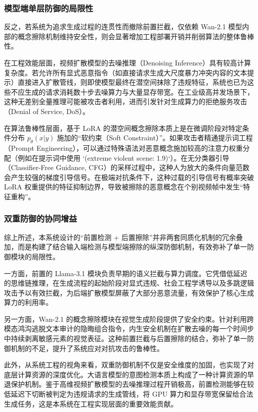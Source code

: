 \subsubsection{模型端单层防御的局限性}

反之，若系统为追求生成过程的连贯性而撤除前置拦截，仅依赖 Wan-2.1 模型内部的概念擦除机制维持安全性，则会显著增加工程部署开销并削弱算法的整体鲁棒性。

在工程效能层面，视频扩散模型的去噪推理（Denoising Inference）具有较高计算复杂度。若允许所有显式恶意指令（如直接请求生成大尺度暴力冲突内容的文本提示）直接进入扩散管线，则即使模型最终在潜空间抹除了违规特征，系统也已为这些不应生成的请求消耗数十步去噪算力与大量显存带宽。在工业级高并发场景下，这种无差别全量推理可能被攻击者利用，进而引发针对生成算力的拒绝服务攻击（Denial of Service, DoS）。

在算法鲁棒性层面，基于 LoRA 的潜空间概念擦除本质上是在微调阶段对特定条件分布 $p_\theta(x|y)$ 施加的“软约束（Soft Constraint）”。如果攻击者精通提示词工程（Prompt Engineering），可以通过特殊语法对恶意概念施加较高的注意力权重分配（例如在提示词中使用 `(extreme violent scene: 1.9)`）。在无分类器引导（Classifier-Free Guidance, CFG）的采样过程中，这种人为放大的条件向量范数会产生较强的梯度引导信号。在极端对抗条件下，这种过载的引导信号有概率突破 LoRA 权重提供的特征抑制边界，导致被擦除的恶意概念在个别视频帧中发生“特征重构”。

\subsubsection{双重防御的协同增益}

综上所述，本系统设计的“前置检测 + 后置擦除”并非两套同质化机制的冗余叠加，而是构建了结合输入端检测与模型端擦除的纵深防御机制，有效弥补了单一防御模块的局限性。

一方面，前置的 Llama-3.1 模块负责早期的语义拦截与算力调度。它凭借低延迟的思维链推理，在生成流程的起始阶段对显式违规、社会工程学诱导以及多跳逻辑攻击予以有效拦截，为后端扩散模型屏蔽了大部分恶意流量，有效保护了核心生成算力的利用率。

另一方面，Wan-2.1 的概念擦除模块在视觉生成阶段提供了安全约束。针对利用跨模态鸿沟逃脱文本审计的隐晦组合指令，内生安全机制在扩散去噪的每一个时间步中持续剥离敏感元素的视觉表征。这种前置拦截与后置擦除的结合，弥补了单一防御机制的不足，提升了系统应对对抗攻击的鲁棒性。

此外，从系统工程的视角来看，双重防御机制不仅是安全维度的加固，也实现了对底层计算资源的深度优化。大语言模型的意图检测本质上构成了一种计算资源的早退保护机制。鉴于高维视频扩散模型的去噪推理过程开销极高，前置检测能够在较低延迟下切断被判定为违规请求的生成管线，将 GPU 算力和显存带宽保留给合法生成任务，这是本系统在工程实现层面的重要效能贡献。

